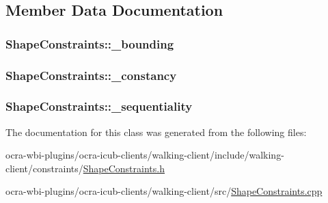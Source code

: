 \subsection{\-Member \-Data \-Documentation}
\hypertarget{classShapeConstraints_aec4139d7b2b7af78543227873fcc9b6c}{
\subsubsection[{\-\_\-bounding}]{ {\bf \-Shape\-Constraints\-::\-\_\-bounding}}}\label{classShapeConstraints_aec4139d7b2b7af78543227873fcc9b6c}
\hypertarget{classShapeConstraints_a1682a6b89b7c6c058ccb183b689862a3}{
\subsubsection[{\-\_\-constancy}]{ {\bf \-Shape\-Constraints\-::\-\_\-constancy}}}\label{classShapeConstraints_a1682a6b89b7c6c058ccb183b689862a3}
\hypertarget{classShapeConstraints_a0a503cf10835b98ddaa4031a7c63ef42}{
\subsubsection[{\-\_\-sequentiality}]{ {\bf \-Shape\-Constraints\-::\-\_\-sequentiality}}}\label{classShapeConstraints_a0a503cf10835b98ddaa4031a7c63ef42}


\-The documentation for this class was generated from the following files\-:\begin{DoxyCompactItemize}
\item 
ocra-\/wbi-\/plugins/ocra-\/icub-\/clients/walking-\/client/include/walking-\/client/constraints/\hyperlink{ShapeConstraints_8h}{\-Shape\-Constraints.\-h}\item 
ocra-\/wbi-\/plugins/ocra-\/icub-\/clients/walking-\/client/src/\hyperlink{ShapeConstraints_8cpp}{\-Shape\-Constraints.\-cpp}\end{DoxyCompactItemize}
